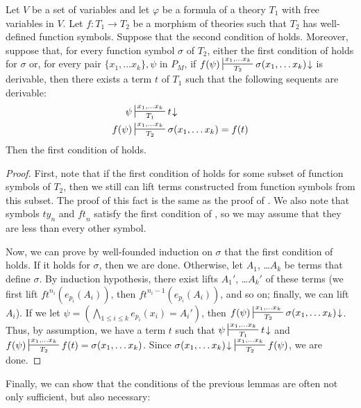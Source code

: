 \documentclass[reqno]{amsart}
\theoremstyle{definition}
\theoremstyle{remark}
\newcommand{\ft}{\mathit{ft}}
\newcommand{\ty}{\mathit{ty}}
\numberwithin{figure}{section}
\begin{document}
\begin{lem}
Let $V$ be a set of variables and let $\varphi$ be a formula of a theory $T_1$ with free variables in $V$.
Let $f : T_1 \to T_2$ be a morphism of theories such that $T_2$ has well-defined function symbols.
Suppose that the second condition of  holds.
Moreover, suppose that, for every function symbol $\sigma$ of $T_2$, either the first condition of  holds for $\sigma$ or,
for every pair $\{ x_1, \ldots x_k \},\psi$ in $P_M$, if $f(\psi) \sststile{T_2}{x_1, \ldots x_k} \sigma(x_1, \ldots x_k)\!\downarrow$ is derivable, then there exists a term $t$ of $T_1$ such that the following sequents are derivable:
\begin{align*}
\psi & \sststile{T_1}{x_1, \ldots x_k} t\!\downarrow \\
f(\psi) & \sststile{T_2}{x_1, \ldots x_k} \sigma(x_1, \ldots x_k) = f(t)
\end{align*}
Then the first condition of  holds.
\end{lem}
\begin{proof}
First, note that if the first condition of  holds for some subset of function symbols of $T_2$, then we still can lift terms constructed from function symbols from this subset.
The proof of this fact is the same as the proof of .
We also note that symbols $\ty_n$ and $\ft_n$ satisfy the first condition of , so we may assume that they are less than every other symbol.

Now, we can prove by well-founded induction on $\sigma$ that the first condition of  holds.
If it holds for $\sigma$, then we are done.
Otherwise, let $A_1$, \ldots $A_k$ be terms that define $\sigma$.
By induction hypothesis, there exist lifts $A_1'$, \ldots $A_k'$ of these terms (we first lift $\ft^{n_i}(e_{p_i}(A_i))$, then $\ft^{n_i-1}(e_{p_i}(A_i))$, and so on; finally, we can lift $A_i$).
If we let $\psi = (\bigwedge_{1 \leq i \leq k} e_{p_i}(x_i) = A_i')$, then $f(\psi) \sststile{T_2}{x_1, \ldots x_k} \sigma(x_1, \ldots x_k)\!\downarrow$.
Thus, by assumption, we have a term $t$ such that $\psi \sststile{T_1}{x_1, \ldots x_k} t\!\downarrow$ and $f(\psi) \sststile{T_2}{x_1, \ldots x_k} f(t) = \sigma(x_1, \ldots x_k)$.
Since $\sigma(x_1, \ldots x_k)\!\downarrow\ \sststile{T_2}{x_1, \ldots x_k} f(\psi)$, we are done.
\end{proof}

Finally, we can show that the conditions of the previous lemmas are often not only sufficient, but also necessary:
\end{document}
